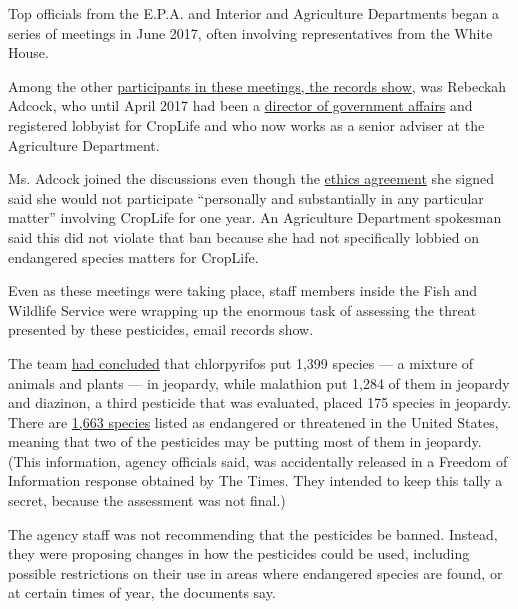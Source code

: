 Top officials from the E.P.A. and Interior and Agriculture Departments
began a series of meetings in June 2017, often involving representatives
from the White House.

Among the other
\href{https://www.documentcloud.org/documents/5778894-Trump-Era-Shift-Evaluating-Pesticide-Threats-to.html\#document/p35/a488257}{participants
in these meetings, the records show}, was Rebeckah Adcock, who until
April 2017 had been a
\href{https://www.documentcloud.org/documents/4824481-Rebeckah-Adcock-Resume.html}{director
of government affairs} and registered lobbyist for CropLife and who now
works as a senior adviser at the Agriculture Department.

Ms. Adcock joined the discussions even though the
\href{https://assets.documentcloud.org/documents/4193032/Rebeckah-Adcock-Ethics-Agreement-1.pdf}{ethics
agreement} she signed said she would not participate ``personally and
substantially in any particular matter'' involving CropLife for one
year. An Agriculture Department spokesman said this did not violate that
ban because she had not specifically lobbied on endangered species
matters for CropLife.

Even as these meetings were taking place, staff members inside the Fish
and Wildlife Service were wrapping up the enormous task of assessing the
threat presented by these pesticides, email records show.

The team
\href{https://www.documentcloud.org/documents/5778894-Trump-Era-Shift-Evaluating-Pesticide-Threats-to.html\#document/p1/a488282}{had
concluded} that chlorpyrifos put 1,399 species --- a mixture of animals
and plants --- in jeopardy, while malathion put 1,284 of them in
jeopardy and diazinon, a third pesticide that was evaluated, placed 175
species in jeopardy. There are
\href{https://ecos.fws.gov/ecp0/reports/box-score-report}{1,663 species}
listed as endangered or threatened in the United States, meaning that
two of the pesticides may be putting most of them in jeopardy. (This
information, agency officials said, was accidentally released in a
Freedom of Information response obtained by The Times. They intended to
keep this tally a secret, because the assessment was not final.)

The agency staff was not recommending that the pesticides be banned.
Instead, they were proposing changes in how the pesticides could be
used, including possible restrictions on their use in areas where
endangered species are found, or at certain times of year, the documents
say.


